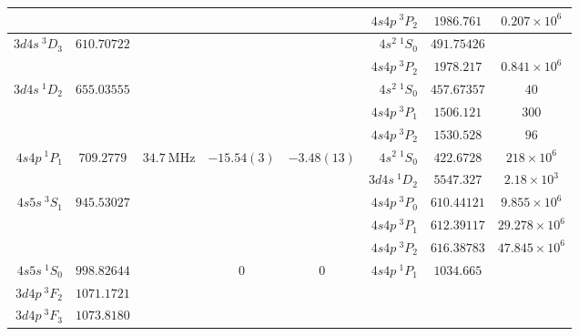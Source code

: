 \documentclass[aps,prx,10pt]{revtex4-2}
\begin{document}
\begin{longtable}{|r|c|c|c|c|r|c|c|}
\cline{6-8}
&&&&&$4s4p\ {}^{\mathrm{3}}\!P_2$&$1986.761$&$0.207\times10^{6}$\cite{zhouMagicPhys.Rev.A2010}\\
\hline
\multirow{2}{*}{$3d4s\ {}^{\mathrm{3}}\!D_3$}&\multirow{2}{*}{$610.70722$}&\multirow{2}{*}{}&\multirow{2}{*}{}&\multirow{2}{*}{}&$4s^2\ {}^{\mathrm{1}}\!S_0$&$491.75426$&\\
\cline{6-8}
&&&&&$4s4p\ {}^{\mathrm{3}}\!P_2$&$1978.217$&$0.841\times10^{6}$\cite{zhouMagicPhys.Rev.A2010}\\
\hline
\multirow{3}{*}{$3d4s\ {}^{\mathrm{1}}\!D_2$}&\multirow{3}{*}{$655.03555$}&\multirow{3}{*}{}&\multirow{3}{*}{}&\multirow{3}{*}{}&$4s^2\ {}^{\mathrm{1}}\!S_0$&$457.67357$&$40$\cite{vogtCreation2009}\\
\cline{6-8}
&&&&&$4s4p\ {}^{\mathrm{3}}\!P_1$&$1506.121$&$300$\cite{vogtCreation2009}\\
\cline{6-8}
&&&&&$4s4p\ {}^{\mathrm{3}}\!P_2$&$1530.528$&$96$\cite{vogtCreation2009}\\
\hline
\multirow{2}{*}{$4s4p\ {}^{\mathrm{1}}\!P_1$}&\multirow{2}{*}{$709.2779$\cite{machholmCalculationsPhys.Rev.A2001}}&\multirow{2}{*}{$34.7\ \mathrm{MHz}$\cite{machholmCalculationsPhys.Rev.A2001}}&\multirow{2}{*}{$-15.54(3)$\cite{nortershauserIsotopeSpectrochimicaActaPartB:AtomicSpectroscopy1998}}&\multirow{2}{*}{$-3.48(13)$\cite{nortershauserIsotopeSpectrochimicaActaPartB:AtomicSpectroscopy1998}}&$4s^2\ {}^{\mathrm{1}}\!S_0$&$422.6728$\cite{machholmCalculationsPhys.Rev.A2001}&$218\times10^{6}$\cite{machholmCalculationsPhys.Rev.A2001}\\
\cline{6-8}
&&&&&$3d4s\ {}^{\mathrm{1}}\!D_2$&$5547.327$&$2.18\times10^3$\cite{vogtCreation2009}\\
\hline
\multirow{3}{*}{$4s5s\ {}^{\mathrm{3}}\!S_1$}&\multirow{3}{*}{$945.53027$}&\multirow{3}{*}{}&\multirow{3}{*}{}&\multirow{3}{*}{}&$4s4p\ {}^{\mathrm{3}}\!P_0$&$610.44121$&$9.855\times10^{6}$\cite{zhouMagicPhys.Rev.A2010}\\
\cline{6-8}
&&&&&$4s4p\ {}^{\mathrm{3}}\!P_1$&$612.39117$&$29.278\times10^{6}$\cite{zhouMagicPhys.Rev.A2010}\\
\cline{6-8}
&&&&&$4s4p\ {}^{\mathrm{3}}\!P_2$&$616.38783$&$47.845\times10^{6}$\cite{zhouMagicPhys.Rev.A2010}\\
\hline
$4s5s\ {}^{\mathrm{1}}\!S_0$&$998.82644$&&$0$&$0$&$4s4p\ {}^{\mathrm{1}}\!P_1$&$1034.665$&\\
\hline
$3d4p\ {}^{\mathrm{3}}\!F_2$&$1071.1721$&&&&&&\\
\hline
$3d4p\ {}^{\mathrm{3}}\!F_3$&$1073.8180$&&&&&&\\

\end{longtable}
\end{document}

